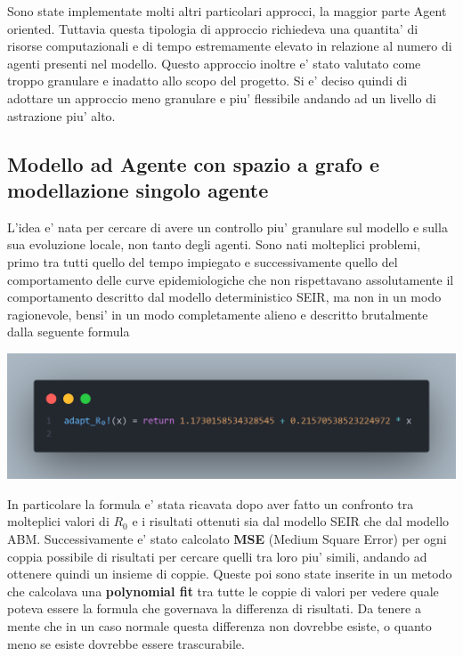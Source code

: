 Sono state implementate molti altri particolari approcci, la maggior parte Agent oriented.
Tuttavia questa tipologia di approccio richiedeva una quantita' di risorse computazionali 
e di tempo estremamente elevato in relazione al numero di agenti presenti nel modello. Questo approccio 
inoltre e' stato valutato come troppo granulare e inadatto allo scopo del progetto. 
Si e' deciso quindi di adottare un approccio meno granulare e piu' flessibile 
andando ad un livello di astrazione piu' alto.

\subsection{Modello ad Agente con spazio a grafo e modellazione singolo agente}
L'idea e' nata per cercare di avere un controllo piu' granulare sul modello e sulla sua 
evoluzione locale, non tanto degli agenti. Sono nati molteplici problemi, primo tra tutti quello del tempo impiegato
e successivamente quello del comportamento delle curve epidemiologiche che non rispettavano 
assolutamente il comportamento descritto dal modello deterministico SEIR, ma non in un modo 
ragionevole, bensi' in un modo completamente alieno e descritto brutalmente dalla
seguente formula 

\begin{minipage}{\linewidth}
    \centering
    \includegraphics[width=\textwidth]{img/rapporto_strano.png}
    \label{fig:strange_behaviour_R0}
\end{minipage}

In particolare la formula e' stata ricavata dopo aver fatto un confronto tra molteplici 
valori di $R_0$ e i risultati ottenuti sia dal modello SEIR che dal modello ABM. 
Successivamente e' stato calcolato \textbf{MSE} (Medium Square Error) per ogni coppia possibile
di risultati per cercare quelli tra loro piu' simili, andando ad ottenere quindi un insieme
di coppie. Queste poi sono state inserite in un metodo che calcolava una \textbf{polynomial fit}
tra tutte le coppie di valori per vedere quale poteva essere la formula che governava la differenza 
di risultati. Da tenere a mente che in un caso normale questa differenza non dovrebbe esiste, 
o quanto meno se esiste dovrebbe essere trascurabile.

